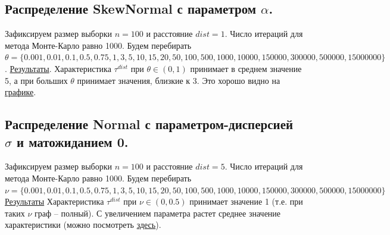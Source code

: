 \documentclass{report}
\begin{document}
\subsection{Распределение SkewNormal с параметром $\alpha$.}
Зафиксируем размер выборки $n = 100$ и расстояние $dist = 1$. Число итераций для метода Монте-Карло равно 1000.
\newline
\newline
Будем перебирать \\
$\theta = \{0.001, 0.01, 0.1, 0.5, 0.75, 1, 3, 5, 10, 15, 20, 50, 100, 500, 1000, 10000, 150000, 300000, 500000, 15000000\}$.
\newline
\newline
\href{https://github.com/misshimichka/dm-random-graphs/blob/dmitrii/report/report/fix_construct_skewnorm_mis_dist.png}{Результаты}. 
\newline
\newline
Характеристика $\tau^{dist}$ при $\theta \in (0, 1)$ принимает в среднем значение 5, а при больших $\theta$ принимает значения, близкие к 3. Это хорошо видно на \href{https://github.com/misshimichka/dm-random-graphs/blob/dmitrii/report/report/fix_construct_skewnorm_alpha2avg_mis_dist.png}{графике}.

\subsection{Распределение Normal с параметром-дисперсией $\sigma$ и матожиданием 0.}
Зафиксируем размер выборки $n = 100$ и расстояние $dist = 5$. Число итераций для метода Монте-Карло равно 1000.
\newline
\newline
Будем перебирать \\
$\nu = \{0.001, 0.01, 0.1, 0.5, 0.75, 1, 3, 5, 10, 15, 20, 50, 100, 500, 1000, 10000, 150000, 300000, 500000, 15000000\}$
\newline
\newline
\href{https://github.com/misshimichka/dm-random-graphs/blob/dmitrii/report/report/fix_construct_norm_mis_dist.png}{Результаты}
\newline
\newline
Характеристика $\tau^{dist}$ при $\nu \in (0, 0.5)$ принимает значение 1 (т.е. при таких $\nu$ граф -- полный). С увеличением параметра растет среднее значение характеристики (можно посмотреть \href{https://github.com/misshimichka/dm-random-graphs/blob/dmitrii/report/report/fix_construct_norm_sigma2avg_mis_dist.png}{здесь}).
\end{document}
